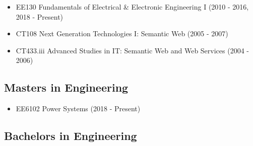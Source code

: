 \documentclass[10pt,a4paper]{res} %
\begin{document}
\begin{resume}
\begin{itemize} \itemsep -2pt
\item EE130 Fundamentals of Electrical \& Electronic Engineering I (2010 - 2016, 2018 - Present)
\item CT108 Next Generation Technologies I: Semantic Web (2005 - 2007)
\item CT433.iii Advanced Studies in IT: Semantic Web and Web Services (2004 - 2006)
\end{itemize}

\subsection*{Masters in Engineering}

\begin{itemize} \itemsep -2pt
\item EE6102 Power Systems (2018 - Present)
\end{itemize}

\subsection*{Bachelors in Engineering}


\end{resume}
\end{document}
